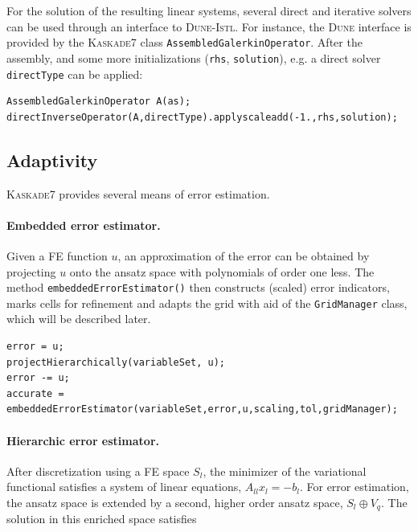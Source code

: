\documentclass[11pt]{article}
\newcommand{\K}{\textsc{Kaskade7 }}
\begin{document}
For the solution of the resulting linear systems, several direct and iterative solvers can be used through 
an interface to \textsc{Dune-Istl}. 
For instance, the \textsc{Dune}  interface is provided by the 
\K class {\tt AssembledGalerkinOperator}.  
After the assembly, and some more initializations ({\tt rhs}, {\tt solution}), 
e.g. a direct solver {\tt directType} can be applied:

\begin{lstlisting}
AssembledGalerkinOperator A(as);
directInverseOperator(A,directType).applyscaleadd(-1.,rhs,solution);
\end{lstlisting}


\subsection{Adaptivity}\label{subsec:adaptivity} 
%
\K provides several means of error estimation.
\paragraph{Embedded error estimator.} Given a FE function $u$, an approximation of the error can be obtained by 
projecting $u$ onto the ansatz space with polynomials of order one less. The method {\tt embeddedErrorEstimator()} 
then constructs (scaled) error indicators, marks cells for refinement and adapts the grid with aid of the 
{\tt GridManager} class, which will be described later.

\begin{lstlisting}
error = u;
projectHierarchically(variableSet, u);
error -= u;
accurate = embeddedErrorEstimator(variableSet,error,u,scaling,tol,gridManager);
\end{lstlisting}

\paragraph{Hierarchic error estimator.} After discretization using a FE space $S_l$, the minimizer of the variational 
functional satisfies a system of linear equations, $A_{ll} x_l = -b_l$. For error estimation, the ansatz space is 
extended by a second, higher order ansatz space, $S_l \oplus V_q$. 
The solution in this enriched space satisfies
\end{document}

